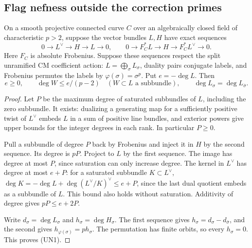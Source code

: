 \subsection{Flag nefness outside the correction primes}
\label{sec:geometry-uncorrected-flag-nefness}

\begin{lemma}
\label{lem:geometry-two-filtration-nefness}
On a smooth projective connected curve \(C\) over an algebraically
closed field of characteristic \(p>2\), suppose the vector bundles
\(L,H\) have exact sequences
\[
 0\to L^\vee\to H\to L\to0,\qquad
 0\to F_C^*L\to H\to F_C^*L^\vee\to0.
\]
Here \(F_C\) is absolute Frobenius. Suppose these sequences respect
the split unramified CM coefficient action: \(L=\bigoplus_\sigma
L_\sigma\), duality pairs conjugate labels, and Frobenius permutes the
labels by \(\varphi(\sigma)=\sigma^p\). Put \(e=-\deg L\). Then
\[
 e\ge0,\qquad \deg W\le e/(p-2)\quad(W\subset L\text{ a subbundle}),
 \qquad \deg L_\sigma=\deg L_{\bar\sigma}.
 \tag{UN1}
\]
\end{lemma}
\begin{proof}
Let \(P\) be the maximum degree of saturated subbundles of \(L\),
including the zero subbundle. It exists: dualizing a generating map
for a sufficiently positive twist of \(L^\vee\) embeds \(L\) in a
sum of positive line bundles, and exterior powers give upper bounds
for the integer degrees in each rank. In particular \(P\ge0\).

Pull a subbundle of degree \(P\) back by Frobenius and inject it in
\(H\) by the second sequence. Its degree is \(pP\). Project to \(L\)
by the first sequence. The image has degree at most \(P\), since
saturation can only increase degree. The kernel in \(L^\vee\) has
degree at most \(e+P\): for a saturated subbundle \(K\subset L^\vee\),
\(\deg K=-\deg L+\deg (L^\vee/K)^\vee\le e+P\), since the last
dual quotient embeds as a subbundle of \(L\). This bound also holds
without saturation. Additivity of degree gives \(pP\le e+2P\).

Write \(d_\sigma=\deg L_\sigma\) and \(h_\sigma=\deg H_\sigma\).
The first sequence gives \(h_\sigma=d_\sigma-d_{\bar\sigma}\),
and the second gives \(h_{\varphi(\sigma)}=p h_\sigma\).
The permutation has finite orbits, so every \(h_\sigma=0\).
This proves (UN1).
\end{proof}

